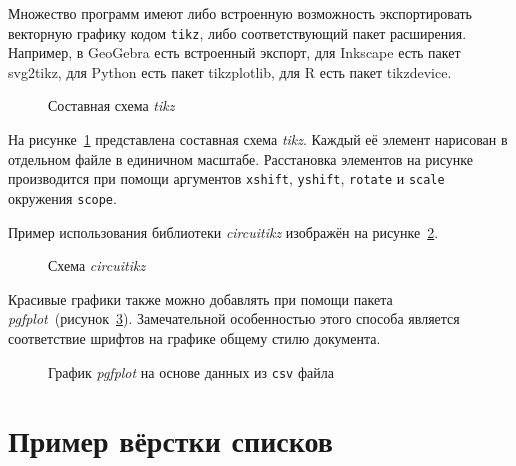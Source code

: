 Множество программ имеют либо встроенную возможность экспортировать векторную
графику кодом \verb|tikz|, либо соответствующий пакет расширения.
Например, в GeoGebra есть встроенный экспорт,
для Inkscape есть пакет svg2tikz,
для Python есть пакет tikzplotlib,
для R есть пакет tikzdevice.

\begin{figure}[htbp]
                \caption{Составная схема \textit{tikz}}\label{fig:scheme-tikz}
\end{figure}

На рисунке~\cref{fig:scheme-tikz} представлена составная схема \textit{tikz}.
Каждый её элемент нарисован в отдельном файле в единичном масштабе.
Расстановка элементов на рисунке производится при помощи аргументов \texttt{xshift},
\texttt{yshift}, \texttt{rotate} и \texttt{scale} окружения \texttt{scope}.

Пример использования библиотеки \textit{circuitikz} изображён на рисунке~\cref{fig:circuitikz}.

\begin{figure}[htbp]
        \centerfloat{
            
        }
        \caption{Схема \textit{circuitikz}}\label{fig:circuitikz}
\end{figure}

Красивые графики также можно добавлять при помощи пакета \textit{pgfplot}~(рисунок~\cref{fig:pgfplot}).
Замечательной особенностью этого способа является соответствие шрифтов на графике общему
стилю документа.

\begin{figure}[htbp]
        \centerfloat{
            
        }
        \caption{График \textit{pgfplot} на основе данных из \texttt{csv} файла}\label{fig:pgfplot}
\end{figure}


\section{Пример вёрстки списков}\label{sec:ch2/sec3}


